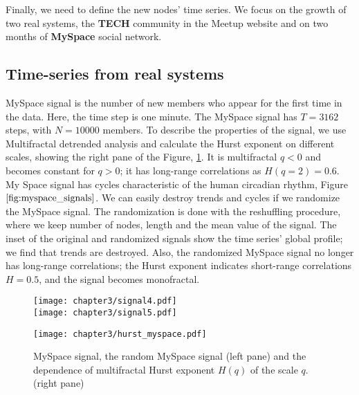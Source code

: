 Finally, we need to define the new nodes' time series. We focus on the growth of two real systems, the \textbf{TECH} \cite{smiljanic2017associative} community in the Meetup website and on two months of \textbf{MySpace} \cite{suvakov2013} social network. %

\subsection{Time-series from real systems} %

MySpace signal is the number of new members who appear for the first time in the data. Here, the time step is one minute. The MySpace signal has $T = 3162$ steps, with  $N = 10000$ members. To describe the properties of the signal, we use Multifractal detrended analysis and calculate the Hurst exponent on different scales, showing the right pane of the Figure, \ref{fig:myspace_signals}. It is multifractal $q<0$ and becomes constant for $q>0$; it has long-range correlations as $H(q=2)=0.6$. My Space signal has cycles characteristic of the human circadian rhythm, Figure $\ref{fig:myspace_signals}$. We can easily destroy trends and cycles if we randomize the MySpace signal. The randomization is done with the reshuffling procedure, where we keep number of nodes, length and the mean value of the signal. The inset of the original and randomized signals show the time series' global profile; we find that trends are destroyed. Also, the randomized MySpace signal no longer has long-range correlations; the Hurst exponent indicates short-range correlations $H=0.5$, and the signal becomes monofractal.    


\begin{figure}[H]
	\centering
	\begin{minipage}[b]{0.4\textwidth}
		\centering
		\texttt{[image: chapter3/signal4.pdf]}\\
		\texttt{[image: chapter3/signal5.pdf]}
	\end{minipage}
	\begin{minipage}[b]{0.45\textwidth}
		\centering
		\texttt{[image: chapter3/hurst\_myspace.pdf]}
		\vspace{0.01cm}
	\end{minipage}
	\caption[Properties of MySpace signal.]{MySpace signal, the random MySpace signal (left pane) and the dependence of multifractal Hurst exponent $H(q)$ of the scale $q$. (right pane)}
	\label{fig:myspace_signals}
\end{figure}

